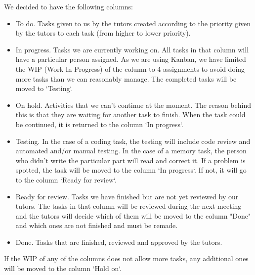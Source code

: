 We decided to have the following columns:
\begin{itemize}
\item To do. Tasks given to us by the tutors created according to the priority given by the tutors to each task (from higher to lower priority). 
\item In progress. Tasks we are currently working on. All tasks in that column will have a particular person assigned. As we are using Kanban, we have limited the WIP (Work In Progress) of the column to 4 assignments to avoid doing more tasks than we can reasonably manage. The completed tasks will be moved to `Testing`.
\item On hold. Activities that we can't continue at the moment. The reason behind this is that they are waiting for another task to finish. When the task could be continued, it is returned to the column `In progress`.
\item Testing. In the case of a coding task, the testing will include code review and automated and/or manual testing. In the case of a memory task, the person who didn't write the particular part will read and correct it. If a problem is spotted, the task will be moved to the column `In progress`. If not, it will go to the column `Ready for review`.
\item Ready for review.  Tasks we have finished but are not yet reviewed by our tutors. The tasks in that column will be reviewed during the next meeting and the tutors will decide which of them will be moved to the column "Done" and which ones are not finished and must be remade.
\item Done. Tasks that are finished, reviewed and approved by the tutors.
\end{itemize}

If the WIP of any of the columns does not allow more tasks, any additional ones will be moved to the column `Hold on`. 
